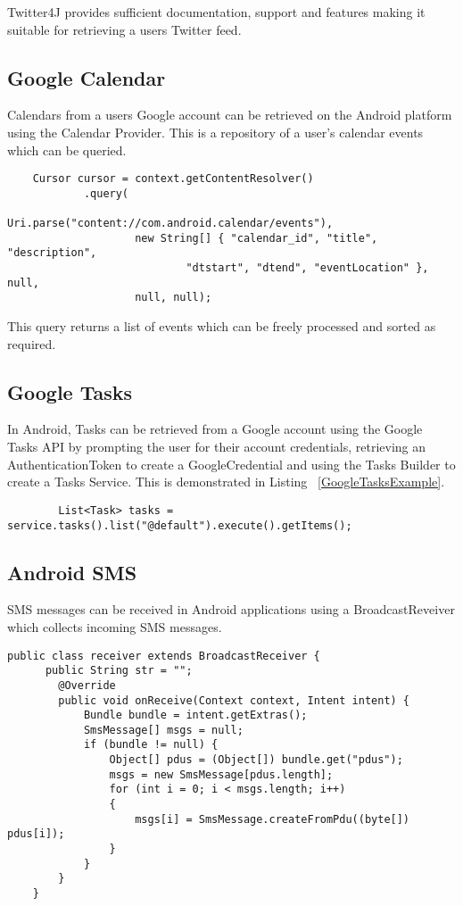 Twitter4J provides sufficient documentation, support and features making it suitable for retrieving a users Twitter feed.  

\subsection{Google Calendar}
Calendars from a users Google account can be retrieved on the Android platform using the Calendar Provider. This is a repository of a user's calendar events which can be queried.

\lstset{language=Java, caption=Calendar Provider example }
\begin{lstlisting}
    Cursor cursor = context.getContentResolver()
            .query(
                    Uri.parse("content://com.android.calendar/events"),
                    new String[] { "calendar_id", "title", "description",
                            "dtstart", "dtend", "eventLocation" }, null,
                    null, null);
\end{lstlisting}

This query returns a list of events which can be freely processed and sorted as required. 
\subsection{Google Tasks}
In Android, Tasks can be retrieved from a Google account using the Google Tasks API by prompting the user for their account credentials, retrieving an AuthenticationToken to create a GoogleCredential and using the Tasks Builder to create a Tasks Service. This is demonstrated in Listing ~\ref{GoogleTasksExample}.

\lstset{language=Java, caption=Google Tasks example, label=GoogleTasksExample}
\begin{lstlisting}
    	List<Task> tasks = service.tasks().list("@default").execute().getItems();
\end{lstlisting}

\subsection{Android SMS}
SMS messages can be received in Android applications using a BroadcastReveiver which collects incoming SMS messages.

\lstset{language=Java, caption=Android SMS example, label=AndroidSMSExample}
\begin{lstlisting}
public class receiver extends BroadcastReceiver {
      public String str = "";
        @Override
        public void onReceive(Context context, Intent intent) {
            Bundle bundle = intent.getExtras();
            SmsMessage[] msgs = null;
            if (bundle != null) {
                Object[] pdus = (Object[]) bundle.get("pdus");
                msgs = new SmsMessage[pdus.length];
                for (int i = 0; i < msgs.length; i++) 
                {
                    msgs[i] = SmsMessage.createFromPdu((byte[]) pdus[i]);
                }
            }
        }
    }
\end{lstlisting}

